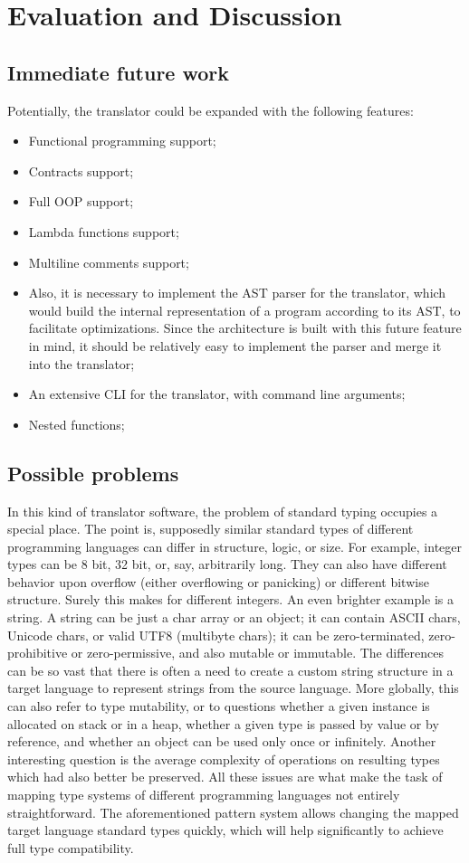 \chapter{Evaluation and Discussion}
\label{chap:eval}

\section{Immediate future work}
Potentially, the translator could be expanded with the following features:
\begin{itemize}
    \item Functional programming support;
    \item Contracts support;
    \item Full OOP support;
    \item Lambda functions support;
    \item Multiline comments support;
    \item Also, it is necessary to implement the AST parser for the translator, which would build the internal representation of a program according to its AST, to facilitate optimizations. Since the architecture is built with this future feature in mind, it should be relatively easy to implement the parser and merge it into the translator;
    \item An extensive CLI for the translator, with command line arguments;
    \item Nested functions;
\end{itemize}


\section{Possible problems}
In this kind of translator software, the problem of standard typing occupies a special place. The point is, supposedly similar standard types of different programming languages can differ in structure, logic, or size.
For example, integer types can be 8 bit, 32 bit, or, say, arbitrarily long. They can also have different behavior upon overflow (either overflowing or panicking) or different bitwise structure. Surely this makes for different integers.
An even brighter example is a string. A string can be just a char array or an object; it can contain ASCII chars, Unicode chars, or valid UTF8 (multibyte chars); it can be zero-terminated, zero-prohibitive or zero-permissive, and also mutable or immutable. The differences can be so vast that there is often a need to create a custom string structure in a target language to represent strings from the source language.
More globally, this can also refer to type mutability, or to questions whether a given instance is allocated on stack or in a heap, whether a given type is passed by value or by reference, and whether an object can be used only once or infinitely. Another interesting question is the average complexity of operations on resulting types which had also better be preserved. All these issues are what make the task of mapping type systems of different programming languages not entirely straightforward.
The aforementioned pattern system allows changing the mapped target language standard types quickly, which will help significantly to achieve full type compatibility.

